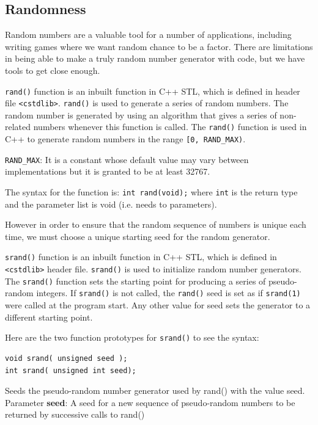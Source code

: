 \subsection{Randomness}

Random numbers are a valuable tool for a number of applications, including writing games where we want random chance to be a factor. There are limitations in being able to make a truly random number generator with code, but we have tools to get close enough.

\texttt{rand()} function is an inbuilt function in C++ STL, which is defined in header file \texttt{<cstdlib>}. \texttt{rand()} is used to generate a series of random numbers. The random number is generated by using an algorithm that gives a series of non-related numbers whenever this function is called. The \texttt{rand()} function is used in C++ to generate random numbers in the range \texttt{[0, RAND_MAX)}.

\texttt{RAND_MAX}: It is a constant whose default value may vary between implementations but it is granted to be at least 32767.

The syntax for the function is: \texttt{int rand(void);} where \texttt{int} is the return type and the parameter list is void (i.e. needs to parameters).

However in order to ensure that the random sequence of numbers is unique each time, we must choose a unique starting seed for the random generator.

\texttt{srand()} function is an inbuilt function in C++ STL,  which is defined in \texttt{<cstdlib>} header file. \texttt{srand()} is used to initialize random number generators. The \texttt{srand()} function sets the starting point for producing a series of pseudo-random integers. If \texttt{srand()} is not called, the \texttt{rand()} seed is set as if \texttt{srand(1)} were called at the program start. Any other value for seed sets the generator to a different starting point. 

Here are the two function prototypes for \texttt{srand()} to see the syntax:

\begin{verbatim}
void srand( unsigned seed );
int srand( unsigned int seed);
\end{verbatim}

Seeds the pseudo-random number generator used by rand() with the value seed.
Parameter \textbf{seed}: A seed for a new sequence of pseudo-random numbers to be returned by successive calls to rand()

